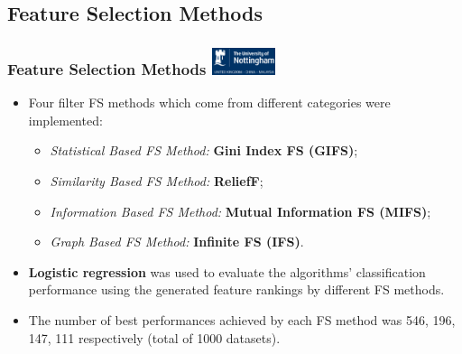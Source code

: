 \documentclass[aspectratio=1610]{beamer}
\newcommand{\UoN}
  {\hfill {\includegraphics[height=0.8cm]{nott_logo/nott_logo_white.png}}}
\begin{document}
\subsection{Feature Selection Methods}
\begin{frame}
\frametitle{Feature Selection Methods \UoN}
	\begin{itemize}
		\item Four filter FS methods which come from different categories were implemented:
			\begin{itemize}
				\item \textit{Statistical Based FS Method:} \textbf{Gini Index FS (GIFS)};
				\item \textit{Similarity Based FS Method:} \textbf{ReliefF};
				\item \textit{Information Based FS Method:} \textbf{Mutual Information FS (MIFS)};
				\item \textit{Graph Based FS Method:} \textbf{Infinite FS (IFS)}.
			\end{itemize}
		\vspace{0.4cm}
		\item \textbf{Logistic regression} was used to evaluate the algorithms' classification performance using the generated feature rankings by different FS methods.
		\vspace{0.4cm}
		\item The number of best performances achieved by each FS method was 546, 196, 147, 111 respectively (total of 1000 datasets).
	\end{itemize}
\end{frame}
\end{document}
